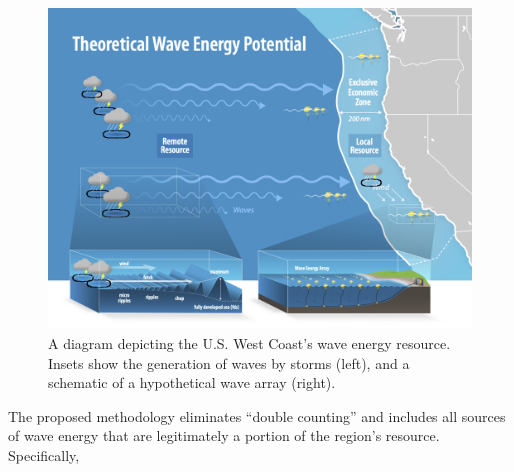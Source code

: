 \begin{figure}[ht]
\centering
\includegraphics[width=\linewidth]{../fig/NREL-water-NatureEnergyGraphic-Levi-FY21-jfrenzl-v5.png}
\caption{A diagram depicting the U.S. West Coast's wave energy resource. Insets show the generation of waves by storms (left), and a schematic of a hypothetical wave array (right).}
\label{fig:diagram:west-eez}
\end{figure}

The proposed methodology eliminates ``double counting'' and includes all sources of wave energy that are legitimately a portion of the region's resource. Specifically,

